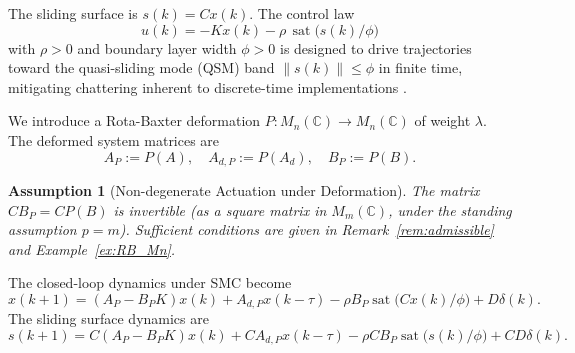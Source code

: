 \documentclass[10pt]{amsart}
\DeclareMathOperator{\sat}{sat}
\numberwithin{equation}{section}
\newtheorem{assumption}[theorem]{Assumption}
\begin{document}
The sliding surface is $s(k) = C x(k)$. The control law
\[
u(k) = -K x(k) - \rho \, \sat\bigl(s(k)/\phi\bigr)
\]
with \(\rho > 0\) and boundary layer width \(\phi > 0\) is designed to drive trajectories
toward the quasi-sliding mode (QSM) band \(\|s(k)\| \leq \phi\) in finite time, mitigating
chattering inherent to discrete-time implementations \cite{Utkin1992, Edwards1998}.

We introduce a Rota-Baxter deformation \(P: M_n(\mathbb{C}) \to M_n(\mathbb{C})\) of
weight \(\lambda\). The deformed system matrices are
\[
A_P := P(A), \quad A_{d,P} := P(A_d), \quad B_P := P(B).
\]

\begin{assumption}[Non-degenerate Actuation under Deformation]\label{ass:invert}
The matrix \(C B_P = C P(B)\) is invertible (as a square matrix in $M_m(\mathbb{C})$,
under the standing assumption $p=m$). Sufficient conditions are given in
Remark~\ref{rem:admissible} and Example~\ref{ex:RB_Mn}.
\end{assumption}

The closed-loop dynamics under SMC become
\begin{equation}\label{eq:closed}
x(k+1) = (A_P - B_P K) x(k) + A_{d,P} x(k-\tau)
         - \rho B_P \sat\bigl(C x(k)/\phi\bigr) + D \delta(k).
\end{equation}
The sliding surface dynamics are
\begin{equation}\label{eq:sliding_dyn}
s(k+1) = C(A_P - B_P K)x(k) + C A_{d,P} x(k-\tau)
         - \rho C B_P \sat\bigl(s(k)/\phi\bigr) + C D \delta(k).
\end{equation}
\end{document}
